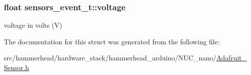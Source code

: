 \subsubsection[{\texorpdfstring{voltage}{voltage}}]{\setlength{\rightskip}{0pt plus 5cm}float sensors\+\_\+event\+\_\+t\+::voltage}\hypertarget{structsensors__event__t_ab01b52f6b83f390a6370d319ded97b28}{}\label{structsensors__event__t_ab01b52f6b83f390a6370d319ded97b28}
voltage in volts (V) 

The documentation for this struct was generated from the following file\+:\begin{DoxyCompactItemize}
\item 
src/hammerhead/hardware\+\_\+stack/hammerhead\+\_\+arduino/\+N\+U\+C\+\_\+nano/\hyperlink{Adafruit__Sensor_8h}{Adafruit\+\_\+\+Sensor.\+h}\end{DoxyCompactItemize}
